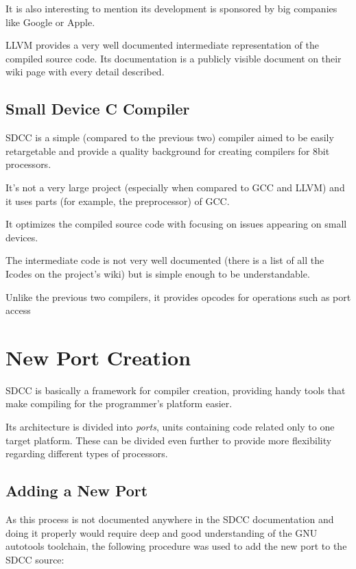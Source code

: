     It is also interesting to mention its development is sponsored by big companies like Google or Apple.

    LLVM provides a very well documented intermediate representation of the compiled source code. Its documentation is a publicly visible document on their wiki page with every detail described.

    \section{Small Device C Compiler}

    SDCC is a simple (compared to the previous two) compiler aimed to be easily retargetable and provide a quality background for creating compilers for 8bit processors.

    It's not a very large project (especially when compared to GCC and LLVM) and it uses parts (for example, the preprocessor) of GCC.

    It optimizes the compiled source code with focusing on issues appearing on small devices.

    The intermediate code is not very well documented (there is a list of all the Icodes on the project's wiki) but is simple enough to be understandable.

    Unlike the previous two compilers, it provides opcodes for operations such as port access %
    

\chapter{New Port Creation}\label{port}

SDCC is basically a framework for compiler creation, providing handy tools that make compiling for the programmer's platform easier.

Its architecture is divided into \emph{ports}, units containing code related only to one target platform. These can be divided even further to provide more flexibility regarding different types of processors.

    \section{Adding a New Port}

    As this process is not documented anywhere in the SDCC documentation and doing it properly would require deep and good understanding of the GNU autotools toolchain, the following procedure was used to add the new port to the SDCC source:

